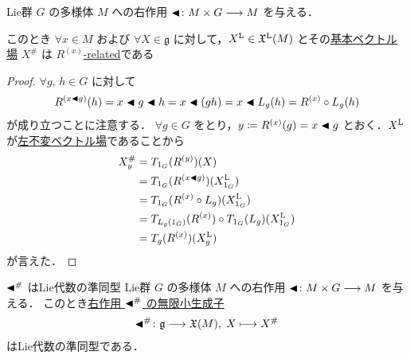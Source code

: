 \documentclass[TQFT_main]{subfiles}
\begin{document}
\begin{mylem}[label=lem:fundamental-vecf]{}
    Lie群 $G$ の\cinfty 多様体 $M$ への右作用 $\blacktriangleleft \colon M \times G \longrightarrow M$ を与える．
    
    このとき $\forall x \in M$ および $\forall X \in \mathfrak{g}$ に対して，$X^{\mathrm{L}} \in \mathfrak{X}^{\mathrm{L}}(M)$ とその\hyperref[def:fundamental-vecf]{基本ベクトル場} $X^\#$ は $R^{(x)}$\hyperref[def:F-related]{-related}である
\end{mylem}

\begin{proof}
    $\forall g,\, h \in G$ に対して
    \begin{align}
        R^{(x \blacktriangleleft g)}(h) = x \blacktriangleleft g \blacktriangleleft h = x \blacktriangleleft(gh) = x \blacktriangleleft L_g(h) = R^{(x)} \circ L_g(h)
    \end{align}
    が成り立つことに注意する．
    $\forall g \in G$ をとり，$y \coloneqq R^{(x)}(g) = x \blacktriangleleft g$ とおく．$X^{\mathrm{L}}$ が\hyperref[def:left-invariant]{左不変ベクトル場}であることから
    \begin{align}
        X^\#_y &= T_{1_G}(R^{(y)})(X) \\
        &= T_{1_G} (R^{(x \blacktriangleleft g)}) (X^{\mathrm{L}}_{1_G}) \\
        &= T_{1_G} (R^{(x)} \circ L_g)(X^{\mathrm{L}}_{1_G}) \\
        &= T_{L_g(1_G)} (R^{(x)}) \circ T_{1_G}(L_g)(X^{\mathrm{L}}_{1_G}) \\
        &= T_{g} (R^{(x)}) (X^{\mathrm{L}}_g)
    \end{align}
    が言えた．
\end{proof}


\begin{myprop}[label=prop:infinitesimal-generator-R]{$\blacktriangleleft^\#$ はLie代数の準同型}
    Lie群 $G$ の\cinfty 多様体 $M$ への右作用 $\blacktriangleleft \colon M \times G \longrightarrow M$ を与える．
    このとき\hyperref[def:fundamental-vecf]{右作用 $\blacktriangleleft^\#$ の無限小生成子}
    \begin{align}
        \blacktriangleleft^\# \colon \mathfrak{g} \longrightarrow \mathfrak{X}(M),\; X \longmapsto X^\#
    \end{align}
    はLie代数の準同型である．
\end{myprop}
\end{document}
